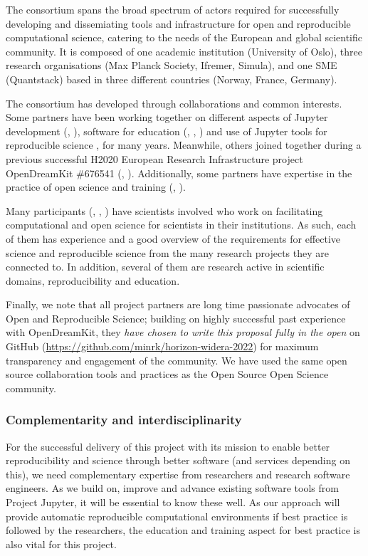 The \TheProject consortium spans the broad spectrum of actors required for
successfully developing and dissemiating tools and infrastructure for open and
reproducible computational science, catering to the needs of the European and
global scientific community. It is composed of one academic institution
(University of Oslo), three research organisations (Max Planck Society, Ifremer,
Simula), and one SME (Quantstack) based in three different countries (Norway,
France, Germany).

The consortium has developed through collaborations and common interests. Some
partners have been working together on different aspects of Jupyter development
(, ), software for education (, ,
) and use of Jupyter tools for reproducible science {,
  } for many years. Meanwhile, others joined together during a
previous successful H2020 European Research Infrastructure project OpenDreamKit
\#676541 (, ). Additionally, some partners have expertise in
the practice of open science and training (, ).

Many participants (, , ) have scientists involved who work on
facilitating computational and open science for scientists in their
institutions. As such, each of them has experience and a good overview of the
requirements for effective science and reproducible science from the many
research projects they are connected to. In addition, several of them are
research active in scientific domains, reproducibility and education.

Finally, we note that all project partners are long time passionate advocates of
Open and Reproducible Science; building on highly successful past experience
with OpenDreamKit, they \emph{have chosen to write this proposal fully in the
  open} on GitHub
(\href{https://github.com/minrk/horizon-widera-2022}{https://github.com/minrk/horizon-widera-2022})
for maximum transparency and engagement of the community. We have used the same
open source collaboration tools and practices as the Open Source Open Science
community.

\subsubsection{Complementarity and interdisciplinarity}

For the successful delivery of this project with its mission to enable better
reproducibility and science through better software (and services depending on
this), we need complementary expertise from researchers and research software
engineers. As we build on, improve and advance existing software tools from
Project Jupyter, it will be essential to know these well. As our approach will
provide automatic reproducible computational environments if best practice is
followed by the researchers, the education and training aspect for best practice
is also vital for this project.

